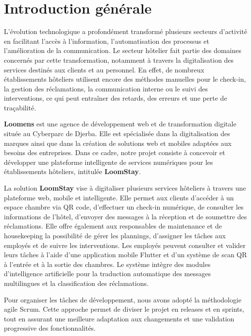 \chapter*{Introduction générale}

L'évolution technologique a profondément transformé plusieurs secteurs d'activité en facilitant l'accès à l'information, l'automatisation des processus et l'amélioration de la communication. Le secteur hôtelier fait partie des domaines concernés par cette transformation, notamment à travers la digitalisation des services destinés aux clients et au personnel. En effet, de nombreux établissements hôteliers utilisent encore des méthodes manuelles pour le check-in, la gestion des réclamations, la communication interne ou le suivi des interventions, ce qui peut entraîner des retards, des erreurs et une perte de traçabilité.

\textbf{Loomens} est une agence de développement web et de transformation digitale située au Cyberparc de Djerba. Elle est spécialisée dans la digitalisation des marques ainsi que dans la création de solutions web et mobiles adaptées aux besoins des entreprises. Dans ce cadre, notre projet consiste à concevoir et développer une plateforme intelligente de services numériques pour les établissements hôteliers, intitulée \textbf{LoomStay}.

La solution \textbf{LoomStay} vise à digitaliser plusieurs services hôteliers à travers une plateforme web, mobile et intelligente. Elle permet aux clients d'accéder à un espace chambre via QR code, d'effectuer un check-in numérique, de consulter les informations de l'hôtel, d'envoyer des messages à la réception et de soumettre des réclamations. Elle offre également aux responsables de maintenance et de housekeeping la possibilité de gérer les plannings, d'assigner les tâches aux employés et de suivre les interventions. Les employés peuvent consulter et valider leurs tâches à l'aide d'une application mobile Flutter et d'un système de scan QR à l'entrée et à la sortie des chambres. Le système intègre des modules d'intelligence artificielle pour la traduction automatique des messages multilingues et la classification des réclamations.

Pour organiser les tâches de développement, nous avons adopté la méthodologie agile Scrum. Cette approche permet de diviser le projet en releases et en sprints, tout en assurant une meilleure adaptation aux changements et une validation progressive des fonctionnalités.


